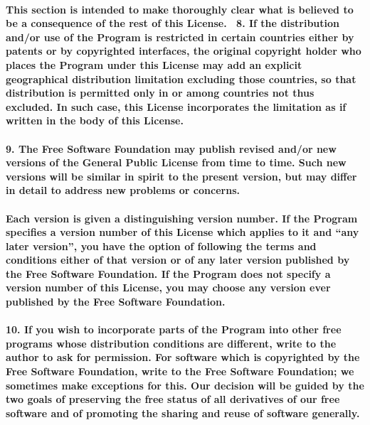 \documentclass[english,letterpaper]{book}
\begin{document}
\paragraph{This section is intended to make thoroughly clear what is believed
to be a consequence of the rest of this License. ~8. If the distribution
and/or use of the Program is restricted in certain countries either
by patents or by copyrighted interfaces, the original copyright holder
who places the Program under this License may add an explicit geographical
distribution limitation excluding those countries, so that distribution
is permitted only in or among countries not thus excluded. In such
case, this License incorporates the limitation as if written in the
body of this License.}


\paragraph{9. The Free Software Foundation may publish revised and/or new versions
of the General Public License from time to time. Such new versions
will be similar in spirit to the present version, but may differ in
detail to address new problems or concerns.}


\paragraph{Each version is given a distinguishing version number. If the Program
specifies a version number of this License which applies to it and
``any later version'', you have the option of following
the terms and conditions either of that version or of any later version
published by the Free Software Foundation. If the Program does not
specify a version number of this License, you may choose any version
ever published by the Free Software Foundation.}


\paragraph{10. If you wish to incorporate parts of the Program into other free
programs whose distribution conditions are different, write to the
author to ask for permission. For software which is copyrighted by
the Free Software Foundation, write to the Free Software Foundation;
we sometimes make exceptions for this. Our decision will be guided
by the two goals of preserving the free status of all derivatives
of our free software and of promoting the sharing and reuse of software
generally.}
\end{document}

